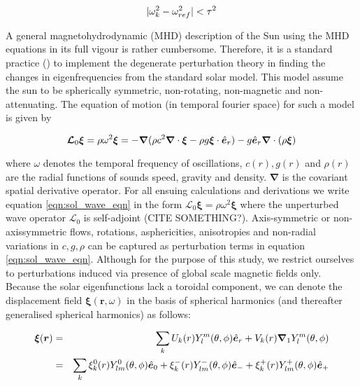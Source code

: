 \begin{equation}
|\omega_k^2 - \omega_{ref}^2| < \tau^2
\end{equation}


A general magnetohydrodynamic (MHD) description of the Sun using the MHD equations in its full vigour is rather cumbersome. Therefore, it is a standard practice (\cite{ritzwoller}\cite{lavely92}) to implement the degenerate perturbation theory in finding the changes in eigenfrequencies from the standard solar model. This model assume the sun to be spherically symmetric, non-rotating, non-magnetic and non-attenuating. The equation of motion (in temporal fourier space) for such a model is given by \citep{jcd_notes}

\begin{equation} \label{eqn:sol_wave_eqn}
\bm{\mathcal{L}}_0 \bm{\xi} = \rho \omega^2 \bm{\xi}  = - \bm{\nabla} (\rho c^2 \boldsymbol{\nabla} \cdot \boldsymbol{\xi} - \rho g \boldsymbol{\xi} \cdot \hat{\bm{e}}_{r}) - g \hat{\bm{e}}_{r} \boldsymbol{\nabla} \cdot (\rho \boldsymbol{\xi})
\end{equation}

where $\omega$ denotes the temporal frequency of oscillations, $c(r), g(r)$ and $\rho(r)$ are the radial functions of sounds speed, gravity and density. $\boldsymbol{\nabla}$ is the covariant spatial derivative operator. For all ensuing calculations and derivations we write equation \ref{eqn:sol_wave_eqn} in the form $\mathcal{L}_0 \boldsymbol{\xi} = \rho \omega^2 \boldsymbol{\xi}$ where the unperturbed wave operator $\mathcal{L}_0$ is self-adjoint (CITE SOMETHING?). Axis-symmetric or non-axissymmetric flows, rotations, asphericities, anisotropies and non-radial variations in $c, g, \rho$ can be captured as perturbation terms in equation \ref{eqn:sol_wave_eqn}. Although for the purpose of this study, we restrict ourselves to perturbations induced via presence of global scale magnetic fields only. 
\\

Because the solar eigenfunctions lack a toroidal component, we can denote the displacement field $\boldsymbol{\xi}(\boldsymbol{r},\omega)$ in the basis of spherical harmonics (and thereafter generalised spherical harmonics) as follows:

\begin{eqnarray} \label{eqn: xi_exp}
    \boldsymbol{\xi}(\boldsymbol{r}) &=& \sum_{k} U_{k}(r) Y_l^m(\theta,\phi) \hat{\bm{e}}_{r}
 + V_{k}(r) \boldsymbol{\nabla}_1 Y_l^m(\theta,\phi) \\
     &=& \sum_{k} \xi_{k}^0(r) Y_{lm}^0(\theta,\phi) \hat{\bm{e}}_{0} + \xi_{k}^-(r) Y_{lm}^-(\theta,\phi) \hat{\bm{e}}_{-} + \xi_{k}^+(r) Y_{lm}^+(\theta,\phi) \hat{\bm{e}}_{+}
 \end{eqnarray}
 
